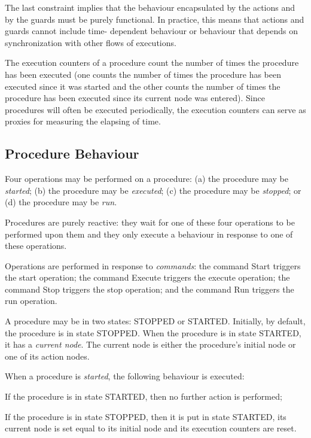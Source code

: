 The last constraint implies that the behaviour encapsulated by the actions and by the guards
must be purely functional. In practice, this means that actions and guards cannot include time-
dependent behaviour or behaviour that depends on synchronization with other flows of
executions.

The execution counters of a procedure count the number of times the procedure has
been executed (one counts the number of times the procedure has been executed since it 
was started and the other counts the number of times the procedure has been executed
since its current node was entered). Since procedures will often be executed periodically,
the execution counters can serve as proxies for measuring the elapsing of time.


\subsection{Procedure Behaviour}\label{sec:procBehaviour} 
Four operations may be performed on a procedure: (a) the procedure may be \emph{started}; (b) the
procedure may be \emph{executed}; (c) the procedure may be \emph{stopped}; or (d) the procedure may be
\emph{run}.

Procedures are purely reactive: they wait for one of these four operations to be performed upon
them and they only execute a behaviour in response to one of these operations.

Operations are performed in response to \emph{commands}: the command Start triggers the start
operation; the command Execute triggers the execute operation; the command Stop triggers the
stop operation; and the command Run triggers the run operation.

A procedure may be in two states: STOPPED or STARTED. Initially, by default, the procedure
is in state STOPPED. When the procedure is in state STARTED, it has a \emph{current node}. The
current node is either the procedure's initial node or one of its action nodes.

When a procedure is \emph{started}, the following behaviour is executed:
\begin{fw_enumerate}
\item If the procedure is in state STARTED, then no further action is performed;
\item If the procedure is in state STOPPED, then it is put in state STARTED, its current
node is set equal to its initial node and its execution counters are reset.
\end{fw_enumerate}

